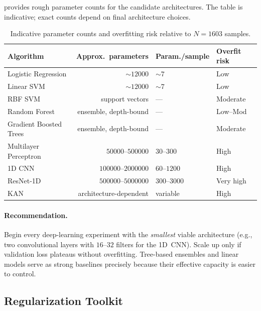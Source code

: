  provides rough parameter counts for the
candidate architectures.  The table is indicative; exact counts depend
on final architecture choices.

\begin{table}[ht]
\centering
\caption{Indicative parameter counts and overfitting risk relative to
         $N=1603$ samples.}
\label{tab:model_capacity}
\small
\begin{tabular}{lrll}
\toprule
\textbf{Algorithm} &
\textbf{Approx.\ parameters} &
\textbf{Param./sample} &
\textbf{Overfit risk} \\
\midrule
Logistic Regression     & ${\sim}\num{12000}$   & ${\sim}7$     & Low      \\
Linear SVM              & ${\sim}\num{12000}$   & ${\sim}7$     & Low      \\
RBF SVM                 & support vectors       & —             & Moderate \\
Random Forest           & ensemble, depth-bound  & —             & Low--Mod \\
Gradient Boosted Trees  & ensemble, depth-bound  & —             & Moderate \\
Multilayer Perceptron   & $\num{50000}$--$\num{500000}$  & $30$--$300$  & High \\
1D CNN                  & $\num{100000}$--$\num{2000000}$ & $60$--$1200$ & High \\
ResNet-1D               & $\num{500000}$--$\num{5000000}$ & $300$--$3000$ & Very high \\
KAN                     & architecture-dependent & variable      & High \\
\bottomrule
\end{tabular}
\end{table}

\paragraph{Recommendation.}
Begin every deep-learning experiment with the \emph{smallest} viable
architecture (e.g., two convolutional layers with $16$--$32$ filters for
the 1D~CNN).  Scale up only if validation loss plateaus without
overfitting.  Tree-based ensembles and linear models serve as strong
baselines precisely because their effective capacity is easier to
control.

\subsection{Regularization Toolkit}
\label{sec:overfit:reg}

